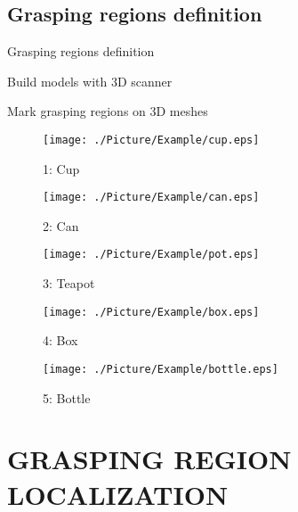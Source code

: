 \documentclass[xcolor=table,compress,blue]{beamer}
\begin{document}
\subsection{Grasping regions definition}
\begin{frame}{Grasping regions definition}
	\begin{exampleblock}{Build models with 3D scanner}
	\end{exampleblock}
	\begin{exampleblock}{Mark grasping regions on 3D meshes}
		\begin{figure}[htpb]
			\centering
			\begin{minipage}[b]{0.8in}
				\centerline{\texttt{[image: ./Picture/Example/cup.eps]}}
				\centerline{\small{1: Cup}}
			\end{minipage}
			\begin{minipage}[b]{0.8in}
				\centerline{\texttt{[image: ./Picture/Example/can.eps]}}
				\centerline{\small{2: Can}}
			\end{minipage}
			\begin{minipage}[b]{0.8in}
				\centerline{\texttt{[image: ./Picture/Example/pot.eps]}}
				\centerline{\small{3: Teapot}}
			\end{minipage}
			\begin{minipage}[b]{0.8in}
				\centerline{\texttt{[image: ./Picture/Example/box.eps]}}
				\centerline{\small{4: Box}}
			\end{minipage}
			\begin{minipage}[b]{0.8in}
				\centerline{\texttt{[image: ./Picture/Example/bottle.eps]}}
				\centerline{\small{5: Bottle}}
			\end{minipage}
			\label{fig:Models} %
		\end{figure}
	\end{exampleblock}
\end{frame}



\section{GRASPING REGION LOCALIZATION}
\end{document}
